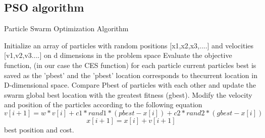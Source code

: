 \documentclass{article}
\begin{document}
\subsection{PSO algorithm}
\begin{algorithm}[H]
\caption{Particle Swarm Optimization Algorithm}
  \begin{algorithmic}[1]
  \STATE Initialize an array of particles with random positions [x1,x2,x3,....] and velocities [v1,v2,v3....] on d dimensions in the problem space
   \STATE Evaluate the objective function, (in our case the CES function) for each particle
      \STATE current particles best is saved as the ’pbest’ and the ’pbest’ location corresponds to thecurrent location in D-dimensional space.
    \ENDIF
   \STATE Compare Pbest of particles with each other and update the swarm global best location with the greatest fitness (gbest).
   \STATE Modify the velocity and position of the particles according to the following equation
  \begin{equation}
      v[i+1] = w*v[i] + c1*rand1*(pbest-x[i]) + c2*rand2*(gbest-x[i])
  \end{equation}
    \begin{equation}
      x[i+1] = x[i]+v[i+1]
  \end{equation}
  \ENDWHILE
  \RETURN best position and cost.
  \end{algorithmic}
\end{algorithm}

  
\end{document}
